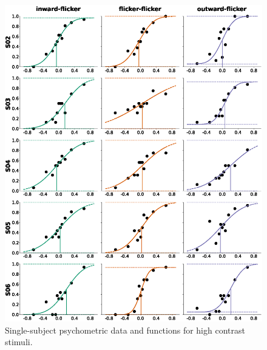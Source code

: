 \begin{figure}[htbp!]
\centering
\includegraphics[width=\textwidth]{figures/chapter_04_SI/figG_hghCnt.eps}
\caption{Single-subject psychometric data and functions for high contrast stimuli.}
\label{fig:psyphySglSbj_hghCnt}
\end{figure}

